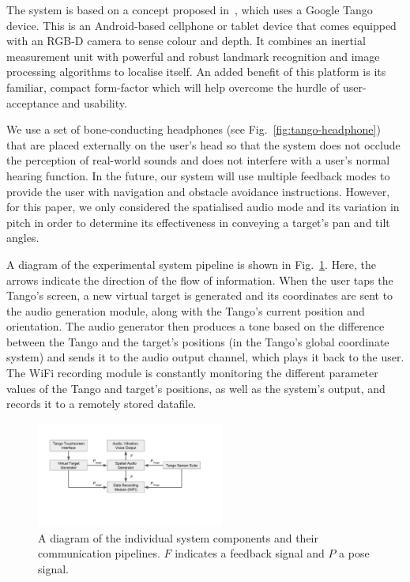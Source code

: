 \documentclass[sigconf, review=true, screen=true, anonymous=true]{acmart}
\begin{document}
The system is based on a concept proposed in~\cite{bellotto2013, lock2017portable}, which uses a Google Tango device. This is an Android-based cellphone or tablet device that comes equipped with an RGB-D camera to sense colour and depth. It combines an inertial measurement unit with powerful and robust landmark recognition and image processing algorithms to localise itself. An added benefit of this platform is its familiar, compact form-factor which will help overcome the hurdle of user-acceptance and usability.

We use a set of bone-conducting headphones (see Fig.~\ref{fig:tango-headphone}) that are placed externally on the user's head so that the system does not occlude the perception of real-world sounds and does not interfere with a user's normal hearing function. In the future, our system will use multiple feedback modes to provide the user with navigation and obstacle avoidance instructions. However, for this paper, we only considered the spatialised audio mode and its variation in pitch in order to determine its effectiveness in conveying a target's pan and tilt angles.

A diagram of the experimental system pipeline is shown in Fig.~\ref{fig:pipeline}. Here, the arrows indicate the direction of the flow of information. When the user taps the Tango's screen, a new virtual target is generated and its coordinates are sent to the audio generation module, along with the Tango's current position and orientation. The audio generator then produces a tone based on the difference between the Tango and the target's positions (in the Tango's global coordinate system) and sends it to the audio output channel, which plays it back to the user. The WiFi recording module is constantly monitoring the different parameter values of the Tango and target's positions, as well as the system's output, and records it to a remotely stored datafile. 

\begin{figure}
  \centering
  \includegraphics[clip=true, trim=50 120 80 50, width=0.55\textwidth]{figures/pipeline.pdf}
  \caption{A diagram of the individual system components and their communication pipelines. $F$ indicates a feedback signal and $P$ a pose signal. }
\label{fig:pipeline}
\end{figure}
\end{document}
